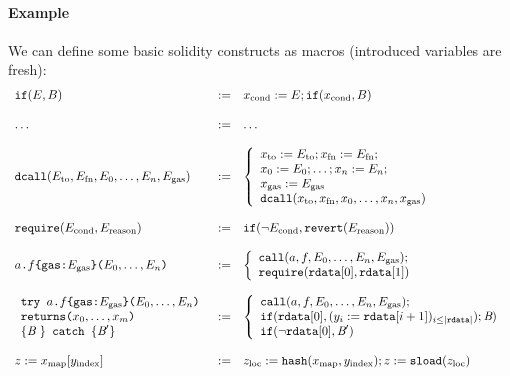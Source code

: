 \documentclass[12pt]{extarticle}
\begin{document}
\paragraph{Example} We can define some basic solidity constructs as macros (introduced variables are fresh):
$$ \begin{array} {lll}
\mathtt{if}(E,B) &:=& x_\textrm{cond} := E; \mathtt{if}(x_\textrm{cond},B)\\\\
\dots &:=& \dots\\\\
\mathtt{dcall}(E_\textrm{to},E_{\textrm{fn}},E_0,\dots,E_n,E_{\textrm{gas}}) &:=& \left\{
\begin{array}{l}
x_\textrm{to} := E_\textrm{to};x_\textrm{fn} := E_\textrm{fn}; \\
x_0 := E_0; \dots; x_n := E_n; \\
x_\textrm{gas} := E_\textrm{gas}\\
\mathtt{dcall}(x_\textrm{to},x_\textrm{fn},x_0,\dots,x_n,x_\textrm{gas})\\\end{array}\right.\\\\
\texttt{require}(E_\textrm{cond},E_\textrm{reason}) &:=& \mathtt{if}(\neg E_\textrm{cond},\mathtt{revert}(E_\textrm{reason}))\\\\
\texttt{$a$.$f$\{gas:$E_\textrm{gas}$\}($E_0,\dots,E_n$)} &:=& \left\{
\begin{array}{l}
    \mathtt{call}(a,f,E_0,\dots,E_n,E_\textrm{gas}); \\
    \texttt{require}(\mathtt{rdata}[0],\mathtt{rdata}[1])
\end{array}\right. \\\\
\begin{array}{l}
\texttt{try $a$.$f$\{gas:$E_\textrm{gas}$\}($E_0,\dots,E_n$)}\\
\texttt{returns($x_0,\dots,x_m$)}\\
\{\textit{B}\ \} \texttt{ catch } \{\textit{B}'\} \end{array} &:=& \left\{
    \begin{array}{l}
        \mathtt{call}(a,f,E_0,\dots,E_n,E_\textrm{gas}); \\
        \mathtt{if}(\mathtt{rdata}[0], (y_i:=\mathtt{rdata}[i+1])_{i\leq |\mathtt{rdata}|});\textit{B}) \\
        \mathtt{if}(\neg\mathtt{rdata}[0], \textit{B}')
    \end{array}\right. \\\\
z:=x_{\rm map}[y_{\rm index}] &:=& z_{\rm loc}:=\mathtt{hash}(x_{\rm map},y_{\rm index}); z:=\mathtt{sload}(z_{\rm loc})
\end{array}
$$
\end{document}
